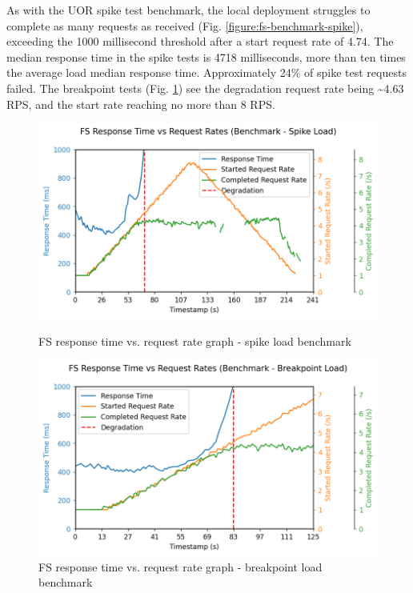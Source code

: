 As with the UOR spike test benchmark, the local deployment struggles to complete as many requests as received (Fig. \ref{figure:fs-benchmark-spike}), exceeding the 1000 millisecond threshold after a start request rate of 4.74. The median response time in the spike tests is 4718 milliseconds, more than ten times the average load median response time. Approximately 24\% of spike test requests failed. The breakpoint tests (Fig. \ref{figure:fs-benchmark-breakpoint}) see the degradation request rate being \textasciitilde4.63 RPS, and the start rate reaching no more than 8 RPS.

\begin{figure}[h]
    \centering
    \begin{minipage}{.47\textwidth}
        \centering
        \includegraphics[width=\linewidth]{figures/fs-benchmark-spike.png}
        \caption{FS response time vs. request rate graph - spike load benchmark}
        \label{figure:fs-benchmark-spike}
    \end{minipage}%
    \hspace{0.05\textwidth} %
    \begin{minipage}{.47\textwidth}
        \centering
        \includegraphics[width=\linewidth]{figures/fs-benchmark-breakpoint.png}
        \caption{FS response time vs. request rate graph - breakpoint load benchmark}
        \label{figure:fs-benchmark-breakpoint}
    \end{minipage}
\end{figure}

